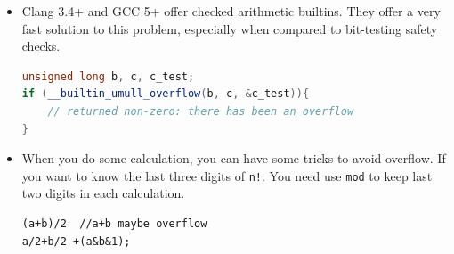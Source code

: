 \documentclass[a4paper,11pt,twoside]{book}
\begin{document}
\begin{itemize}
	\item Clang 3.4+ and GCC 5+ offer checked arithmetic builtins. They offer a very fast solution to this problem, especially when compared to bit-testing safety checks.
\begin{lstlisting}[frame=single, language=c++]
unsigned long b, c, c_test;
if (__builtin_umull_overflow(b, c, &c_test)){
	// returned non-zero: there has been an overflow
}
\end{lstlisting}
	
	\item When you do some calculation, you can have some tricks to avoid overflow. If you  want to know the last three digits of \texttt{n!}. You need use \texttt{mod} to keep last two digits in each calculation.
\begin{lstlisting}[numbers = none]
(a+b)/2  //a+b maybe overflow
a/2+b/2 +(a&b&1);
\end{lstlisting}
	
\end{itemize}
\end{document}

